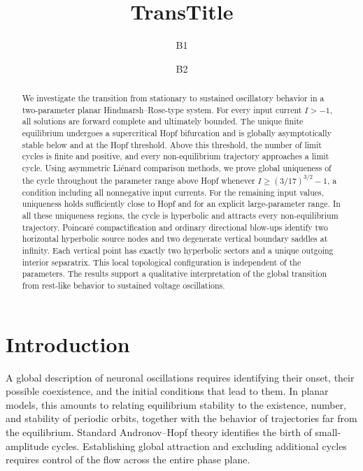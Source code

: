 \documentclass[11pt,reqno]{amsart}
\title[T]{TransTitle}
\author[A1]{B1}
\author[A2]{B2}
\theoremstyle{plain}
\theoremstyle{definition}
\theoremstyle{remark}
\begin{document}
\maketitle


\begin{abstract}
We investigate the transition from stationary to sustained oscillatory
behavior in a two-parameter planar Hindmarsh--Rose-type system.
For every input current $I>-1$, all solutions are forward complete
and ultimately bounded. The unique finite equilibrium undergoes a
supercritical Hopf bifurcation and is globally asymptotically stable
below and at the Hopf threshold. Above this threshold, the number
of limit cycles is finite and positive, and every non-equilibrium
trajectory approaches a limit cycle. Using asymmetric Li\'enard
comparison methods, we prove global uniqueness of the cycle
throughout the parameter range above Hopf whenever
$I\geq(3/17)^{3/2}-1$, a condition including all nonnegative input
currents. For the remaining input values, uniqueness holds
sufficiently close to Hopf and for an explicit large-parameter
range. In all these uniqueness regions, the cycle is hyperbolic
and attracts every non-equilibrium trajectory. Poincar\'e
compactification and ordinary directional blow-ups identify two
horizontal hyperbolic source nodes and two degenerate vertical
boundary saddles at infinity. Each vertical point has exactly
two hyperbolic sectors and a unique outgoing interior separatrix.
This local topological configuration is independent of the
parameters. The results support a qualitative interpretation of
the global transition from rest-like behavior to sustained
voltage oscillations.
\end{abstract}

\section{Introduction}
\label{sec:intro}

A global description of neuronal oscillations requires identifying
their onset, their possible coexistence, and the initial conditions
that lead to them. In planar models, this amounts to relating
equilibrium stability to the existence, number, and stability of
periodic orbits, together with the behavior of trajectories far from
the equilibrium. Standard Andronov--Hopf theory
\cite{kuznetsov2006andronov} identifies the birth of small-amplitude cycles.
Establishing global attraction and excluding additional cycles
requires control of the flow across the entire phase plane.
\end{document}

